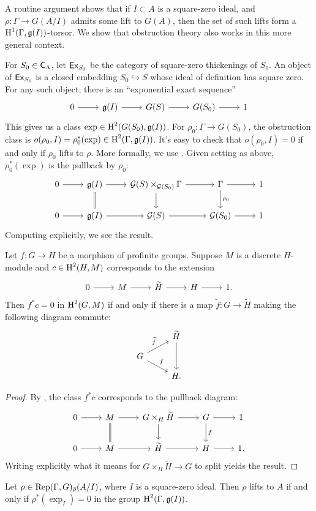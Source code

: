 A routine argument shows that if $I\subset A$ is a square-zero ideal, and 
$\rho\colon \Gamma \to G(A/I)$ admits some lift to $G(A)$, then the set of 
such lifts form a $\operatorname{H}^1(\Gamma,\mathfrak{g}(I))$-torsor. We show that obstruction 
theory also works in this more general context. 

For $S_0\in \mathsf{C}_\Lambda$, let $\mathsf{Ex}_{S_0}$ be the category of square-zero 
thickenings of $S_0$. An object of $\mathsf{Ex}_{S_0}$ is a closed embedding 
$S_0\hookrightarrow S$ whose ideal of definition has square zero. For any 
such object, there is an ``exponential exact sequence''
\[
\begin{tikzcd}
	0 \ar[r]
		& \fg(I) \ar[r]
		& G(S) \ar[r]
		& G(S_0) \ar[r]
		& 1
\end{tikzcd}
\]
This gives us a class $\exp\in \operatorname{H}^2(G(S_0),\mathfrak{g}(I))$. For 
$\rho_0\colon \Gamma\to G(S_0)$, the obstruction class is 
$o(\rho_0,I) = \rho_0^\ast(\exp)\in \operatorname{H}^2(\Gamma,\mathfrak{g}(I))$. It's easy to check 
that $o(\rho_0,I)=0$ if and only if $\rho_0$ lifts to $\rho$. More formally, 
we use \cite[6.6.4]{weibel-1994}. Given setting as above, $\rho_0^\ast(\exp)$ 
is the pullback by $\rho_0$:
\[
\begin{tikzcd}
	0 \ar[r] 
		& \fg(I) \ar[r] \ar[d, equals]
		& \cG(S)\times_{\cG(S_0)} \Gamma \ar[r] \ar[d] 
		& \Gamma \ar[d, "\rho_0"] \ar[r]
		& 1 \\
	0 \ar[r] 
		& \fg(I) \ar[r]
		& \cG(S) \ar[r] 
		& \cG(S_0) \ar[r] 
		& 1
\end{tikzcd}
\]
Computing explicitly, we see the result. 

\begin{proposition}
Let $f\colon G\to H$ be a morphism of profinite groups. Suppose $M$ is a 
discrete $H$-module and $c\in \operatorname{H}^2(H,M)$ corresponds to the extension 
\[
\begin{tikzcd}
	0 \ar[r]
		& M \ar[r]
		& \widetilde H \ar[r]
		& H \ar[r] 
		& 1 .
\end{tikzcd}
\]
Then $f^\ast c=0$ in $\operatorname{H}^2(G,M)$ if and only if there is a map 
$\widetilde f\colon G\to \widetilde H$ making the following diagram commute: 
\[
\begin{tikzcd}[row sep=small]
	& \widetilde H \ar[dd] \\
	G \ar[ur, "\widetilde f"] \ar[dr, "f"] \\
	& H .
\end{tikzcd}
\]
\end{proposition}
\begin{proof}
By \cite[6.6.4]{weibel-1994}, the class $f^\ast c$ corresponds to the pullback 
diagram: 
\[
\begin{tikzcd}
	0 \ar[r]
		& M \ar[r] \ar[d, equals]
		& G\times_H \widetilde{H} \ar[r] \ar[d] 
		& G \ar[r] \ar[d, "f"]
		& 1 \\
	0 \ar[r]
		& M \ar[r]
		& \widetilde H \ar[r]
		& H \ar[r] 
		& 1 .
\end{tikzcd}
\]
Writing explicitly what it means for $G\times_H \widetilde H \to G$ to split 
yields the result. 
\end{proof}

\begin{corollary}
Let $\rho\in \operatorname{Rep}(\Gamma,G)_{\bar\rho}(A/I)$, where $I$ is a square-zero ideal. 
Then $\rho$ lifts to $A$ if and only if $\rho^\ast(\exp_I) = 0$ in the group 
$\operatorname{H}^2(\Gamma,\mathfrak{g}(I))$. 
\end{corollary}
